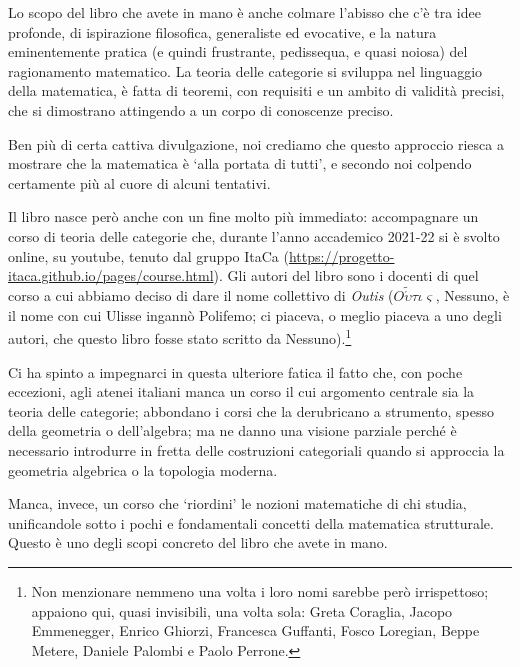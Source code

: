 \medskip
Lo scopo del libro che avete in mano è anche colmare l'abisso che c'è tra idee profonde, di ispirazione filosofica, generaliste ed evocative, e la natura eminentemente pratica (e quindi frustrante, pedissequa, e quasi noiosa) del ragionamento matematico. La teoria delle categorie si sviluppa nel linguaggio della matematica, è fatta di teoremi, con requisiti e un ambito di validità precisi, che si dimostrano attingendo a un corpo di conoscenze preciso.

Ben più di certa cattiva divulgazione, noi crediamo che questo approccio riesca a mostrare che la matematica è `alla portata di tutti', e secondo noi colpendo certamente più al cuore di alcuni tentativi.

\medskip
Il libro nasce però anche con un fine molto più immediato: accompagnare un corso di teoria delle categorie che, durante l'anno accademico 2021-22 si è svolto online, su youtube, tenuto dal gruppo ItaCa (\url{https://progetto-itaca.github.io/pages/course.html}). Gli autori del libro sono i docenti di quel corso a cui abbiamo deciso di dare il nome collettivo di \emph{Outis} (\(O\tilde{\acute\upsilon}\tau\iota\varsigma\), Nessuno, è il nome con cui Ulisse ingannò Polifemo; ci piaceva, o meglio piaceva a uno degli autori, che questo libro fosse stato scritto da Nessuno).\footnote{Non menzionare nemmeno una volta i loro nomi sarebbe però irrispettoso; appaiono qui, quasi invisibili, una volta sola:
	Greta Coraglia, Jacopo Emmenegger, Enrico Ghiorzi, Francesca Guffanti, Fosco Loregian, Beppe Metere, Daniele Palombi e Paolo Perrone.}

Ci ha spinto a impegnarci in questa ulteriore fatica il fatto che, con poche eccezioni, agli atenei italiani manca un corso il cui argomento centrale sia la teoria delle categorie; abbondano i corsi che la derubricano a strumento, spesso della geometria o dell'algebra; ma ne danno una visione parziale perché è necessario introdurre in fretta delle costruzioni categoriali quando si approccia la geometria algebrica o la topologia moderna.

Manca, invece, un corso che `riordini' le nozioni matematiche di chi studia, unificandole sotto i pochi e fondamentali concetti della matematica strutturale. Questo è uno degli scopi concreto del libro che avete in mano.

